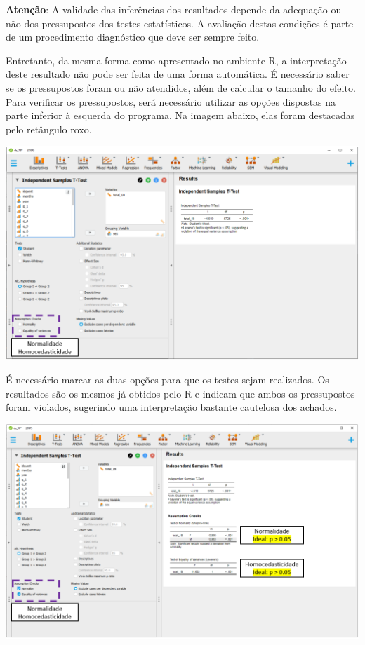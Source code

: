 \documentclass[
]{book}
\begin{document}
\textbf{Atenção}: A validade das inferências dos resultados depende da adequação ou não dos pressupostos dos testes estatísticos. A avaliação destas condições é parte de um procedimento diagnóstico que deve ser sempre feito.

Entretanto, da mesma forma como apresentado no ambiente R, a interpretação deste resultado não pode ser feita de uma forma automática. É necessário saber se os pressupostos foram ou não atendidos, além de calcular o tamanho do efeito. Para verificar os pressupostos, será necessário utilizar as opções dispostas na parte inferior à esquerda do programa. Na imagem abaixo, elas foram destacadas pelo retângulo roxo.

\includegraphics{./img/cap_testet_pressupostos.png}

É necessário marcar as duas opções para que os testes sejam realizados. Os resultados são os mesmos já obtidos pelo R e indicam que ambos os pressupostos foram violados, sugerindo uma interpretação bastante cautelosa dos achados.

\includegraphics{./img/cap_testet_pressupostos2.png}
\end{document}
